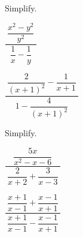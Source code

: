
\begin{exercise}
	Simplify.\\
	\begin{enumerate*}[label={(\arabic*)~}]
		\item $\dfrac{~\dfrac{x^2-y^2}{y^2}~}{~\dfrac1x-\dfrac{1}{y}~}$
		\item $\dfrac{~\dfrac{2}{(x+1)^2}-\dfrac{1}{x+1}~}{~1-\dfrac{4}{(x+1)^2}~}$
		\hfill\null
	\end{enumerate*}
\end{exercise}

\vfill
\begin{center} \hfill
\end{center}


\newpage

\begin{exercise}
	Simplify.\\
	\begin{enumerate*}[label={(\arabic*)~~}]
		\item $\dfrac{~\dfrac{5x}{x^2-x-6}~}{~\dfrac2{x+2}+\dfrac{3}{x-3}~}$
		\item $\dfrac{~\dfrac{x+1}{x-1}+\dfrac{x-1}{x+1}~}{~\dfrac{x+1}{x-1}-\dfrac{x-1}{x+1}~}$
		\hfill\null
	\end{enumerate*}
\end{exercise}

\begin{center} \hfill
\end{center}

